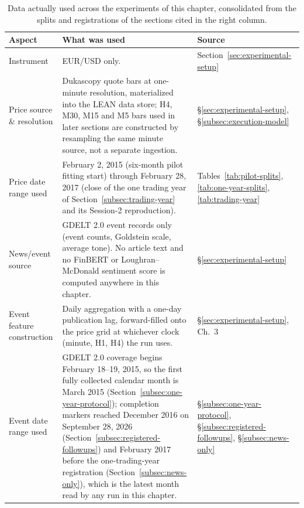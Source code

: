 \begin{table}[htbp]
\centering
\caption{Data actually used across the experiments of this chapter, consolidated from the splits and registrations of the sections cited in the right column.}
\label{tab:data-coverage}
\small
\begin{tabular}{p{3.1cm}p{7.3cm}p{2.4cm}}
\toprule
\textbf{Aspect} & \textbf{What was used} & \textbf{Source} \\
\midrule
Instrument & EUR/USD only. & Section~\ref{sec:experimental-setup} \\
Price source \& resolution & Dukascopy quote bars at one-minute resolution, materialized into the LEAN data store; H4, M30, M15 and M5 bars used in later sections are constructed by resampling the same minute source, not a separate ingestion. & \S\ref{sec:experimental-setup}, \S\ref{subsec:execution-model} \\
Price date range used & February 2, 2015 (six-month pilot fitting start) through February 28, 2017 (close of the one trading year of Section~\ref{subsec:trading-year} and its Session-2 reproduction). & Tables~\ref{tab:pilot-splits}, \ref{tab:one-year-splits}, \ref{tab:trading-year} \\
News/event source & GDELT 2.0 event records only (event counts, Goldstein scale, average tone). No article text and no FinBERT or Loughran--McDonald sentiment score is computed anywhere in this chapter. & \S\ref{sec:experimental-setup} \\
Event feature construction & Daily aggregation with a one-day publication lag, forward-filled onto the price grid at whichever clock (minute, H1, H4) the run uses. & \S\ref{sec:experimental-setup}, Ch.~3 \\
Event date range used & GDELT 2.0 coverage begins February 18--19, 2015, so the first fully collected calendar month is March 2015 (Section~\ref{subsec:one-year-protocol}); completion markers reached December 2016 on September 28, 2026 (Section~\ref{subsec:registered-followups}) and February 2017 before the one-trading-year registration (Section~\ref{subsec:news-only}), which is the latest month read by any run in this chapter. & \S\ref{subsec:one-year-protocol}, \S\ref{subsec:registered-followups}, \S\ref{subsec:news-only} \\
\bottomrule
\end{tabular}
\end{table}

